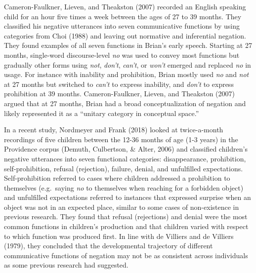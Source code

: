 \documentclass[
  english,
  man,floatsintext]{apa6}
\begin{document}
Cameron-Faulkner, Lieven, and Theakston (2007) recorded an English speaking child for an hour five times a week between the ages of 27 to 39 months. They classified his negative utterances into seven communicative functions by using categories from Choi (1988) and leaving out normative and inferential negation. They found examples of all seven functions in Brian's early speech. Starting at 27 months, single-word discourse-level \emph{no} was used to convey most functions but gradually other forms using \emph{not}, \emph{don't}, \emph{can't}, or \emph{won't} emerged and replaced \emph{no} in usage. For instance with inability and prohibition, Brian mostly used \emph{no} and \emph{not} at 27 months but switched to \emph{can't} to express inability, and \emph{don't} to express prohibition at 39 months. Cameron-Faulkner, Lieven, and Theakston (2007) argued that at 27 months, Brian had a broad conceptualization of negation and likely represented it as a ``unitary category in conceptual space.''

In a recent study, Nordmeyer and Frank (2018) looked at twice-a-month recordings of five children between the 12-36 months of age (1-3 years) in the Providence corpus (Demuth, Culbertson, \& Alter, 2006) and classified children's negative utterances into seven functional categories: disappearance, prohibition, self-prohibition, refusal (rejection), failure, denial, and unfulfilled expectations. Self-prohibition referred to cases where children addressed a prohibition to themselves (e.g.~saying \emph{no} to themselves when reaching for a forbidden object) and unfulfilled expectations referred to instances that expressed surprise when an object was not in an expected place, similar to some cases of non-existence in previous research. They found that refusal (rejections) and denial were the most common functions in children's production and that children varied with respect to which function was produced first. In line with de Villiers and de Villiers (1979), they concluded that the developmental trajectory of different communicative functions of negation may not be as consistent across individuals as some previous research had suggested.
\end{document}
